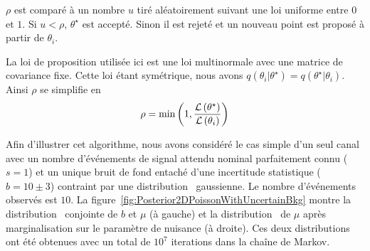 $\rho$ est compar\'e \`a un nombre $u$ tir\'e al\'eatoirement suivant une loi uniforme entre $0$ et $1$. Si $u<\rho$, $\theta^\star$ est accept\'e. Sinon il est rejet\'e et un nouveau point est propos\'e \`a partir de $\theta_i$.

La loi de proposition utilis\'ee ici est une loi multinormale avec une matrice de covariance fixe. Cette loi \'etant sym\'etrique, nous avons $q\left(\theta_i|\theta^\star\right)=q\left(\theta^\star|\theta_i\right)$. Ainsi $\rho$ se simplifie en
\[\rho=\text{min}\left(1,\frac{{\cal L}\left(\theta^\star\right)}{{\cal L}\left(\theta_i\right)}\right)\]

Afin d'illustrer cet algorithme, nous avons consid\'er\'e le cas simple d'un seul canal avec un nombre d'\'ev\'enements de signal attendu nominal parfaitement connu ($s=1$) et un unique bruit de fond entach\'e d'une incertitude statistique ($b=10\pm3$) contraint par une distribution \prior~gaussienne. Le nombre d'\'ev\'enements observ\'es est $10$. La figure~\ref{fig:Posterior2DPoissonWithUncertainBkg} montre la distribution \posterior~conjointe de $b$ et $\mu$ (\`a gauche) et la distribution \posterior~de $\mu$ apr\`es marginalisation sur le param\`etre de nuisance (\`a droite). Ces deux distributions ont \'et\'e obtenues avec un total de $10^7$ iterations dans la cha\^ine de Markov. 


